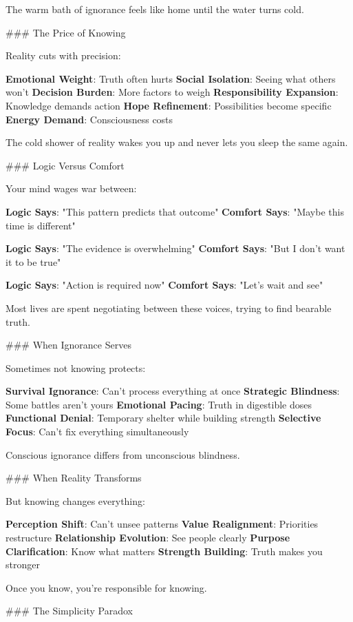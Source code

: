 \documentclass[12pt]{book}
\begin{document}
The warm bath of ignorance feels like home until the water turns cold.

\#\#\# The Price of Knowing

Reality cuts with precision:

\textbf{Emotional Weight}: Truth often hurts
\textbf{Social Isolation}: Seeing what others won't
\textbf{Decision Burden}: More factors to weigh
\textbf{Responsibility Expansion}: Knowledge demands action
\textbf{Hope Refinement}: Possibilities become specific
\textbf{Energy Demand}: Consciousness costs

The cold shower of reality wakes you up and never lets you sleep the same again.

\#\#\# Logic Versus Comfort

Your mind wages war between:

\textbf{Logic Says}: "This pattern predicts that outcome"
\textbf{Comfort Says}: "Maybe this time is different"

\textbf{Logic Says}: "The evidence is overwhelming"
\textbf{Comfort Says}: "But I don't want it to be true"

\textbf{Logic Says}: "Action is required now"
\textbf{Comfort Says}: "Let's wait and see"

Most lives are spent negotiating between these voices, trying to find bearable truth.

\#\#\# When Ignorance Serves

Sometimes not knowing protects:

\textbf{Survival Ignorance}: Can't process everything at once
\textbf{Strategic Blindness}: Some battles aren't yours
\textbf{Emotional Pacing}: Truth in digestible doses
\textbf{Functional Denial}: Temporary shelter while building strength
\textbf{Selective Focus}: Can't fix everything simultaneously

Conscious ignorance differs from unconscious blindness.

\#\#\# When Reality Transforms

But knowing changes everything:

\textbf{Perception Shift}: Can't unsee patterns
\textbf{Value Realignment}: Priorities restructure
\textbf{Relationship Evolution}: See people clearly
\textbf{Purpose Clarification}: Know what matters
\textbf{Strength Building}: Truth makes you stronger

Once you know, you're responsible for knowing.

\#\#\# The Simplicity Paradox
\end{document}
